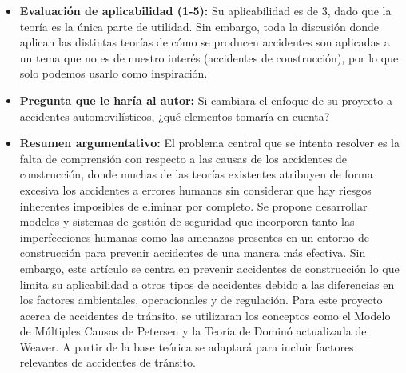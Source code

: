 \documentclass[12pt]{article}
\begin{document}
\begin{itemize}
	\item \textbf{Evaluación de aplicabilidad (1-5):} Su aplicabilidad es de 3, dado 
	que la teoría es la única parte de utilidad. Sin embargo, toda la discusión 
	donde aplican las distintas teorías de cómo se producen accidentes son aplicadas 
	a un tema que no es de nuestro interés (accidentes de construcción), por lo 
	que solo podemos usarlo como inspiración.  
	
	\item \textbf{Pregunta que le haría al autor:}  Si cambiara el enfoque de su 
	proyecto a accidentes automovilísticos, ¿qué elementos tomaría en cuenta? 
	
	\item \textbf{Resumen argumentativo:} El problema central que se intenta 
	resolver es la falta de comprensión con respecto a las causas de los accidentes
	de construcción, donde muchas de las teorías existentes atribuyen de forma 
	excesiva los accidentes a errores humanos sin considerar que hay riesgos 
	inherentes imposibles de eliminar por completo. Se propone desarrollar 
	modelos y sistemas de gestión de seguridad que incorporen tanto las 
	imperfecciones humanas como las amenazas presentes en un entorno de construcción 
	para prevenir accidentes de una manera más efectiva. Sin embargo, este artículo 
	se centra en prevenir accidentes de construcción lo que limita su aplicabilidad
	a otros tipos de accidentes debido a las diferencias en los factores ambientales, 
	operacionales y de regulación. Para este proyecto acerca de accidentes de tránsito, 
	se utilizaran los conceptos como el Modelo de Múltiples Causas de Petersen y 
	la Teoría de Dominó actualizada de Weaver. A partir de la base teórica se adaptará 
	para incluir factores relevantes de accidentes de tránsito. 
	\end{itemize}
	
	
	
	
	
	
	
	
\end{document}
